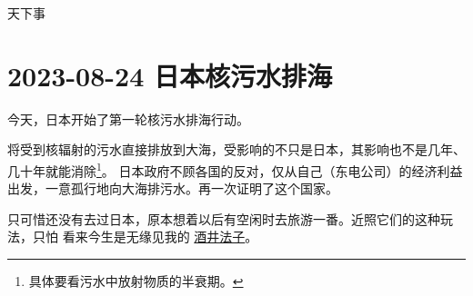 \begin{taged}{天下事}
\section{2023-08-24 日本核污水排海}
\end{taged}

今天，日本开始了第一轮核污水排海行动。

将受到核辐射的污水直接排放到大海，受影响的不只是日本，其影响也不是几年、几十年就能消除\footnote{具体要看污水中放射物质的半衰期。}。
日本政府不顾各国的反对，仅从自己（东电公司）的经济利益出发，一意孤行地向大海排污水。再一次证明了这个国家。

只可惜还没有去过日本，原本想着以后有空闲时去旅游一番。近照它们的这种玩法，只怕
看来今生是无缘见我的 \hyperref[sec:jjfz]{酒井法子}。

